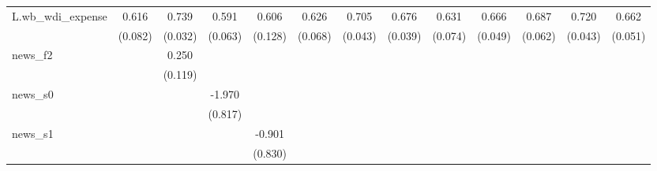 {\begin{tabular}{l*{12}{c}}
\addlinespace
L.wb\_wdi\_expense&       0.616\sym{***}&       0.739\sym{***}&       0.591\sym{***}&       0.606\sym{***}&       0.626\sym{***}&       0.705\sym{***}&       0.676\sym{***}&       0.631\sym{***}&       0.666\sym{***}&       0.687\sym{***}&       0.720\sym{***}&       0.662\sym{***}\\
            &     (0.082)         &     (0.032)         &     (0.063)         &     (0.128)         &     (0.068)         &     (0.043)         &     (0.039)         &     (0.074)         &     (0.049)         &     (0.062)         &     (0.043)         &     (0.051)         \\
\addlinespace
news\_f2     &                     &       0.250\sym{**} &                     &                     &                     &                     &                     &                     &                     &                     &                     &                     \\
            &                     &     (0.119)         &                     &                     &                     &                     &                     &                     &                     &                     &                     &                     \\
\addlinespace
news\_s0     &                     &                     &      -1.970\sym{**} &                     &                     &                     &                     &                     &                     &                     &                     &                     \\
            &                     &                     &     (0.817)         &                     &                     &                     &                     &                     &                     &                     &                     &                     \\
\addlinespace
news\_s1     &                     &                     &                     &      -0.901         &                     &                     &                     &                     &                     &                     &                     &                     \\
            &                     &                     &                     &     (0.830)         &                     &                     &                     &                     &                     &                     &                     &                     \\

\end{tabular}}
